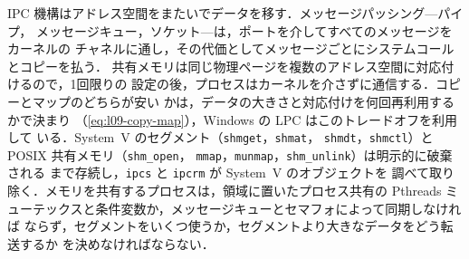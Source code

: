 \documentclass[../main.tex]{subfiles}
\begin{document}
\begin{keypoint}[章のまとめ]
  IPC 機構はアドレス空間をまたいでデータを移す．メッセージパッシング---パイプ，
  メッセージキュー，ソケット---は，ポートを介してすべてのメッセージをカーネルの
  チャネルに通し，その代価としてメッセージごとにシステムコールとコピーを払う．
  共有メモリは同じ物理ページを複数のアドレス空間に対応付けるので，1回限りの
  設定の後，プロセスはカーネルを介さずに通信する．コピーとマップのどちらが安い
  かは，データの大きさと対応付けを何回再利用するかで決まり
  （\cref{eq:l09-copy-map}），Windows の LPC はこのトレードオフを利用して
  いる．System~V のセグメント（\texttt{shmget}，\texttt{shmat}，
  \texttt{shmdt}，\texttt{shmctl}）と POSIX 共有メモリ（\texttt{shm\_open}，
  \texttt{mmap}，\texttt{munmap}，\texttt{shm\_unlink}）は明示的に破棄される
  まで存続し，\texttt{ipcs} と \texttt{ipcrm} が System~V のオブジェクトを
  調べて取り除く．メモリを共有するプロセスは，領域に置いたプロセス共有の Pthreads
  ミューテックスと条件変数か，メッセージキューとセマフォによって同期しなければ
  ならず，セグメントをいくつ使うか，セグメントより大きなデータをどう転送するか
  を決めなければならない．
\end{keypoint}
\end{document}
